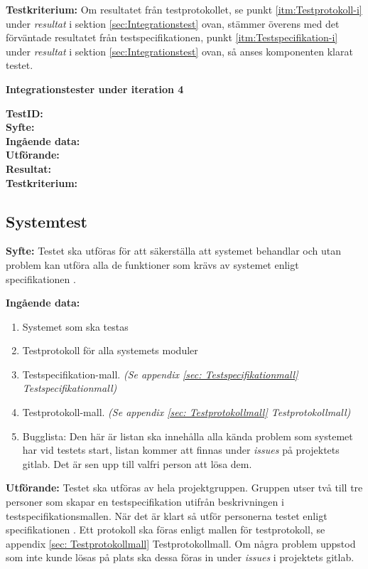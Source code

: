 \documentclass[a4paper,10pt]{article}
\begin{document}
\textbf{Testkriterium:} 
Om resultatet från testprotokollet, se punkt \ref{itm:Testprotokoll-i} under \emph{resultat} i sektion \ref{sec:Integrationstest} ovan, stämmer överens med det förväntade resultatet från testspecifikationen, punkt \ref{itm:Testspecifikation-i} under \emph{resultat} i sektion \ref{sec:Integrationstest} ovan, så anses komponenten klarat testet.

\textbf{Integrationstester under iteration 4}
     
\textbf{TestID:}
\\ \textbf{Syfte:} 
\\ \textbf{Ingående data:} 
\\ \textbf{Utförande:} 
\\ \textbf{Resultat:}	
\\ \textbf{Testkriterium:}
  
\subsection{Systemtest}
\label{sec:Systemtest}
\textbf{Syfte:} Testet ska utföras för att säkerställa att systemet behandlar och utan problem kan utföra alla de funktioner som krävs av systemet enligt specifikationen \cite{kravspec}.

\textbf{Ingående data:}
\begin{enumerate}
	\item Systemet som ska testas
    \item Testprotokoll för alla systemets moduler
    \item Testspecifikation-mall. \emph{(Se appendix \ref{sec: Testspecifikationmall} Testspecifikationmall)}
    \item Testprotokoll-mall. \emph{(Se appendix \ref{sec: Testprotokollmall} Testprotokollmall)}
    \item Bugglista: Den här är listan ska innehålla alla kända problem som systemet har vid testets start, listan kommer att finnas under \emph{issues} på 	 projektets gitlab. Det är sen upp till valfri person att lösa dem.
\end{enumerate}

\textbf{Utförande:} Testet ska utföras av hela projektgruppen. Gruppen utser två till tre personer som skapar en testspecifikation utifrån beskrivningen i
testspecifikationsmallen. När det är klart så utför personerna testet enligt specifikationen \cite{kravspec}. Ett protokoll ska föras enligt mallen för
testprotokoll, se appendix \ref{sec: Testprotokollmall} Testprotokollmall. Om några problem uppstod som inte kunde lösas på plats ska dessa föras in under \emph{issues} i projektets gitlab.
\end{document}
